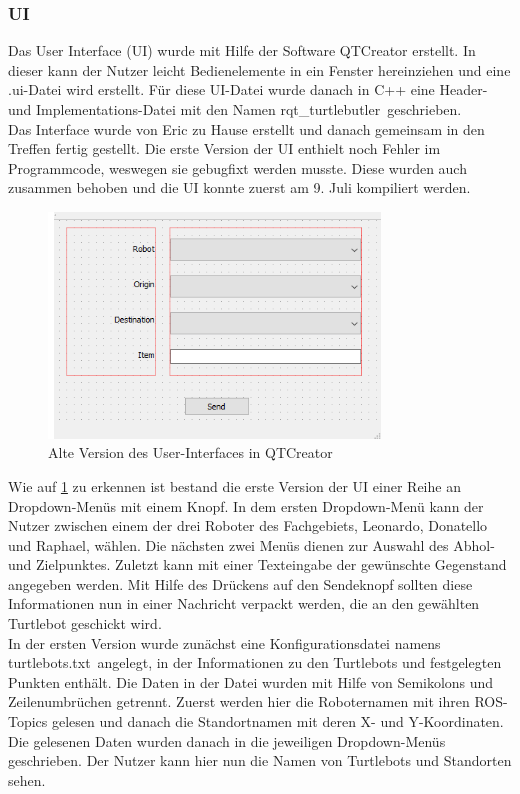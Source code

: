 \documentclass[a4paper,12pt,headsepline]{scrartcl}
\begin{document}
			\subsubsection{UI}
				Das User Interface (UI) wurde mit Hilfe der Software QTCreator erstellt. In dieser kann der Nutzer leicht Bedienelemente in ein Fenster hereinziehen und eine \glqq .ui\grqq-Datei wird erstellt. Für diese UI-Datei wurde danach in C++ eine Header- und Implementations-Datei mit den Namen \glqq rqt{\_}turtlebutler\grqq\ geschrieben.\\
				Das Interface wurde von Eric zu Hause erstellt und danach gemeinsam in den Treffen fertig gestellt. Die erste Version der UI enthielt noch Fehler im Programmcode, weswegen sie gebugfixt werden musste. Diese wurden auch zusammen behoben und die UI konnte zuerst am 9. Juli kompiliert werden.\\
				\begin{figure} [H]
					\centering
					\includegraphics[height=6cm]{Images/Turtlebutler_Old.png}
					\caption{Alte Version des User-Interfaces in QTCreator}
					\label{fig:OldUI}
				\end{figure}
				Wie auf \cref{fig:OldUI} zu erkennen ist bestand die erste Version der UI einer Reihe an Dropdown-Menüs mit einem Knopf. In dem ersten Dropdown-Menü kann der Nutzer zwischen einem der drei Roboter des Fachgebiets, Leonardo, Donatello und Raphael, wählen. Die nächsten zwei Menüs dienen zur Auswahl des Abhol- und Zielpunktes. Zuletzt kann mit einer Texteingabe der gewünschte Gegenstand angegeben werden. Mit Hilfe des Drückens auf den Sendeknopf sollten diese Informationen nun in einer Nachricht verpackt werden, die an den gewählten Turtlebot geschickt wird.\\
				In der ersten Version wurde zunächst eine Konfigurationsdatei namens \glqq turtlebots.txt\grqq\ angelegt, in der Informationen zu den Turtlebots und festgelegten Punkten enthält. Die Daten in der Datei wurden mit Hilfe von Semikolons und Zeilenumbrüchen getrennt. Zuerst werden hier die Roboternamen mit ihren ROS-Topics gelesen und danach die Standortnamen mit deren X- und Y-Koordinaten.  Die gelesenen Daten wurden danach in die jeweiligen Dropdown-Menüs geschrieben. Der Nutzer kann hier nun die Namen von Turtlebots und Standorten sehen.\\
\end{document}
